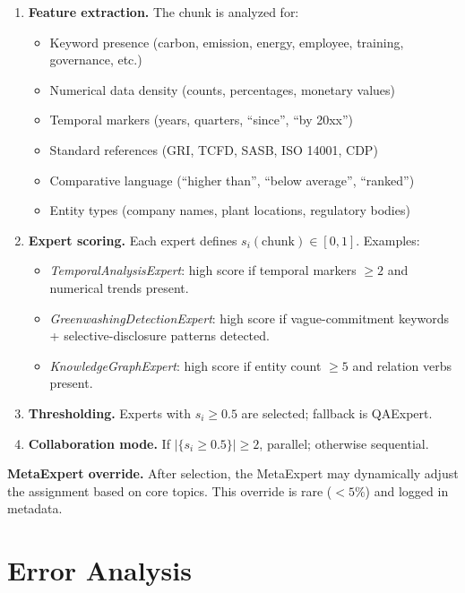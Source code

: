\documentclass[sigconf,nonacm]{acmart}
\begin{document}
\begin{enumerate}[noitemsep]
    \item \textbf{Feature extraction.} The chunk is analyzed for:
    \begin{itemize}[noitemsep]
        \item Keyword presence (carbon, emission, energy, employee, training, governance, etc.)
        \item Numerical data density (counts, percentages, monetary values)
        \item Temporal markers (years, quarters, ``since'', ``by 20xx'')
        \item Standard references (GRI, TCFD, SASB, ISO 14001, CDP)
        \item Comparative language (``higher than'', ``below average'', ``ranked'')
        \item Entity types (company names, plant locations, regulatory bodies)
    \end{itemize}
    
    \item \textbf{Expert scoring.} Each expert defines $s_i(\text{chunk}) \in [0,1]$. Examples:
    \begin{itemize}[noitemsep]
        \item \textit{TemporalAnalysisExpert}: high score if temporal markers $\geq 2$ and numerical trends present.
        \item \textit{GreenwashingDetectionExpert}: high score if vague-commitment keywords + selective-disclosure patterns detected.
        \item \textit{KnowledgeGraphExpert}: high score if entity count $\geq 5$ and relation verbs present.
    \end{itemize}
    
    \item \textbf{Thresholding.} Experts with $s_i \geq 0.5$ are selected; fallback is QAExpert.
    
    \item \textbf{Collaboration mode.} If $|\{s_i \geq 0.5\}| \geq 2$, parallel; otherwise sequential.
\end{enumerate}

\noindent\textbf{MetaExpert override.} After selection, the MetaExpert may dynamically adjust the assignment based on core topics. This override is rare ($<5\%$) and logged in metadata.

\section{Error Analysis}
\end{document}

